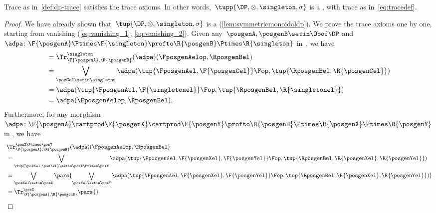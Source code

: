 {    \begin{lemma}\label{lem:dp-trace-is-trace}
        Trace as in~\cref{def:dp-trace} satisfies the trace axioms.
        In other words,~$\tupp{\DP, \otimes, \singleton, \sigma}$ is a , with trace as in~\cref{eq:tracedef}.
    \end{lemma}
    \begin{proof}
        We have already shown that~$\tup{\DP,\otimes,\singleton,\sigma}$ is a  (\cref{lem:symmetricmonoidaldp}).
        We prove the trace axioms one by one, starting from vanishing (\cref{eq:vanishing_1}, \cref{eq:vanishing_2}).
        Given any~$\posgenA,\posgenB\setin \Obof\DP$ and~$\adpa\colon \F{\posgenA}\Ptimes \F{\singleton}\profto \R{\posgenB}\Ptimes \R{\singleton}$ in~\DP, we have
        \begin{equation}
            \begin{aligned}
                 & = \Tr_{\F{\posgenA},\R{\posgenB}}^{\singleton}(\adpa)(\FposgenAelop,\RposgenBel) \\
                 & =\bigvee_{\posCel\setin \singleton}\adpa(\tup{\FposgenAel,\F{\posgenCel}}\Fop,\tup{\RposgenBel,\R{\posgenCel}}) \\
                 & =\adpa(\tup{\FposgenAel,\F{\singletonel}}\Fop,\tup{\RposgenBel,\R{\singletonel}}) \\
                 & =\adpa(\FposgenAelop,\RposgenBel).
            \end{aligned}
        \end{equation}
        Furthermore, for any morphism~$\adpa\colon \F{\posgenA}\cartprod \F{\posgenX}\cartprod \F{\posgenY} \profto \R{\posgenB}\Ptimes \R{\posgenX} \Ptimes \R{\posgenY}$ in \DP, we have
        \begin{equation}
            \begin{aligned}
                ~ & \Tr_{\F{\posgenA},\R{\posgenB}}^{\posX\Ptimes\posY}(\adpa)(\FposgenAelop,\RposgenBel) \\
                  & = \bigvee_{\tup{\posXel,\posYel} \setin \posX\Ptimes \posY} \adpa(\tup{\FposgenAel,\F{\posgenXel},\F{\posgenYel}}\Fop,\tup{\RposgenBel,\R{\posgenXel},\R{\posgenYel}}) \\
                  & =\bigvee_{\posXel \setin \posX}\pars{\bigvee_{\posYel \setin \posY} \adpa(\tup{\FposgenAel,\F{\posgenXel},\F{\posgenYel}}\Fop,\tup{\RposgenBel,\R{\posgenXel},\R{\posgenYel}})} \\
                  & =\Tr_{\F{\posgenA},\R{\posgenB}}^\posX\pars{
}
\end{aligned}
\end{equation}
\end{proof}}
